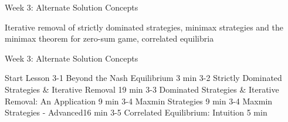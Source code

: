 Week 3: Alternate Solution Concepts

Iterative removal of strictly dominated strategies, minimax strategies and the minimax theorem for zero-sum game, correlated equilibria

Week 3: Alternate Solution Concepts

Start Lesson
3-1 Beyond the Nash Equilibrium 3 min
3-2 Strictly Dominated Strategies & Iterative Removal 19 min
3-3 Dominated Strategies & Iterative Removal: An Application 9 min
3-4 Maxmin Strategies 9 min
3-4 Maxmin Strategies - Advanced16 min
3-5 Correlated Equilibrium: Intuition 5 min
